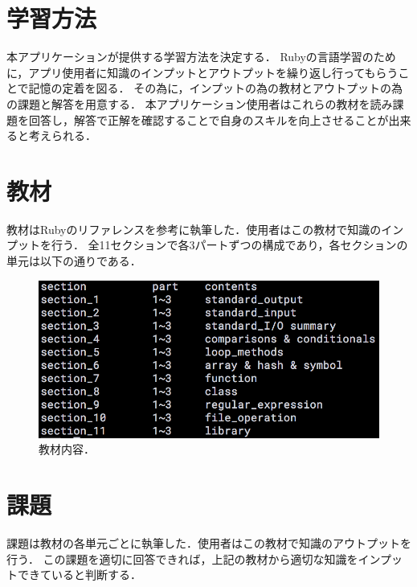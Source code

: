 \section{学習方法}\label{study}
本アプリケーションが提供する学習方法を決定する．
Rubyの言語学習のために，アプリ使用者に知識のインプットとアウトプットを繰り返し行ってもらうことで記憶の定着を図る．
その為に，インプットの為の教材とアウトプットの為の課題と解答を用意する．
本アプリケーション使用者はこれらの教材を読み課題を回答し，解答で正解を確認することで自身のスキルを向上させることが出来ると考えられる．

\section{教材}\label{text}
教材はRubyのリファレンス\cite{reference}を参考に執筆した．使用者はこの教材で知識のインプットを行う．
全11セクションで各3パートずつの構成であり，各セクションの単元は以下の通りである．
\begin{figure}[H]
\centering
\begin{center}
\includegraphics[width=150mm]{../../picture/seq_contents.png}
\end{center}
\caption{教材内容．\label{seq_contents}}
\end{figure}

\section{課題}\label{question}
課題は教材の各単元ごとに執筆した．使用者はこの教材で知識のアウトプットを行う．
この課題を適切に回答できれば，上記の教材から適切な知識をインプットできていると判断する．

